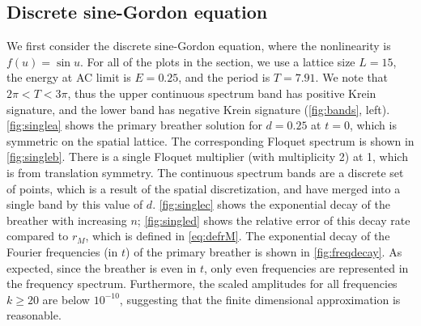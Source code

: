 \documentclass[12pt,reqno]{amsart}
\theoremstyle{definition}
\begin{document}
\subsection{Discrete sine-Gordon equation}

We first consider the discrete sine-Gordon equation, where the nonlinearity is $f(u) = \sin u$. For all of the plots in the section, we use a lattice size $L = 15$, the energy at AC limit is $E = 0.25$, and the period is $T = 7.91$. We note that $2 \pi < T < 3 \pi$, thus the upper continuous spectrum band has positive Krein signature, and the lower band has negative Krein signature (\cref{fig:bands}, left).
\cref{fig:singlea} shows the primary breather solution for $d = 0.25$ at $t = 0$, which is symmetric on the spatial lattice. The corresponding Floquet spectrum is shown in \cref{fig:singleb}. There is a single Floquet multiplier (with multiplicity 2) at 1, which is from translation symmetry. The continuous spectrum bands are a discrete set of points, which is a result of the spatial discretization, and have merged into a single band by this value of $d$. \cref{fig:singlec} shows the exponential decay of the breather with increasing $n$; \cref{fig:singled} shows the relative error of this decay rate compared to $r_M$, which is defined in \cref{eq:defrM}. The exponential decay of the Fourier frequencies (in $t$) of the primary breather is shown in \cref{fig:freqdecay}. As expected, since the breather is even in $t$, only even frequencies are represented in the frequency spectrum. Furthermore, the scaled amplitudes for all frequencies $k\geq 20$ are below $10^{-10}$, suggesting that the finite dimensional approximation is reasonable.
\end{document}
